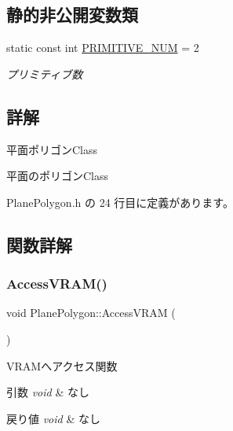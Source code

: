 \subsection*{静的非公開変数類}
\begin{DoxyCompactItemize}
\item 
static const int \mbox{\hyperlink{class_plane_polygon_ad79c2128868044fb495b70ee08c65e8c}{P\+R\+I\+M\+I\+T\+I\+V\+E\+\_\+\+N\+UM}} = 2
\begin{DoxyCompactList}\small\item\em プリミティブ数 \end{DoxyCompactList}\end{DoxyCompactItemize}


\subsection{詳解}
平面ポリゴン\+Class 

平面のポリゴン\+Class 

 Plane\+Polygon.\+h の 24 行目に定義があります。



\subsection{関数詳解}
\mbox{\label{class_plane_polygon_a88e476aa4b627d7242dc4f1b5eccf889}} 
\subsubsection{\texorpdfstring{Access\+V\+R\+A\+M()}{AccessVRAM()}}
{\footnotesize\ttfamily void Plane\+Polygon\+::\+Access\+V\+R\+AM (\begin{DoxyParamCaption}{ }\end{DoxyParamCaption})\hspace{0.3cm}{\ttfamily [private]}}



V\+R\+A\+Mへアクセス関数 


\begin{DoxyParams}{引数}
{\em void} & なし \\
\hline
\end{DoxyParams}

\begin{DoxyRetVals}{戻り値}
{\em void} & なし \\
\hline
\end{DoxyRetVals}


